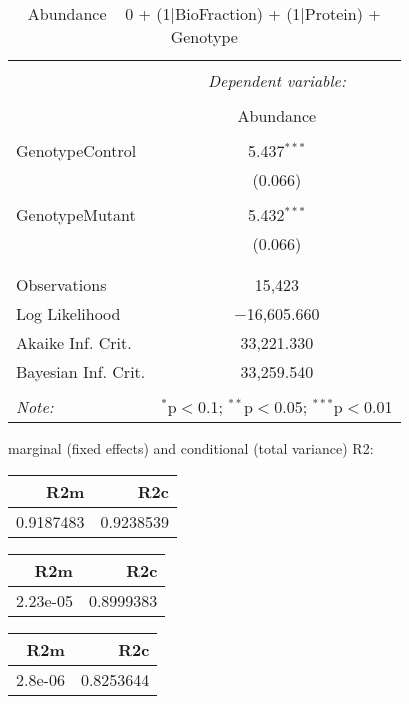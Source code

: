 \documentclass[11pt]{report}
\begin{document}
\begin{table}[!htbp] \centering 
  \caption{Abundance ~ 0 + (1|BioFraction) + (1|Protein) + Genotype} 
  \label{} 
\begin{tabular}{@{\extracolsep{5pt}}lc} 
\\[-1.8ex]\hline 
\hline \\[-1.8ex] 
 & \multicolumn{1}{c}{\textit{Dependent variable:}} \\ 
\cline{2-2} 
\\[-1.8ex] & Abundance \\ 
\hline \\[-1.8ex] 
 GenotypeControl & 5.437$^{***}$ \\ 
  & (0.066) \\ 
  & \\ 
 GenotypeMutant & 5.432$^{***}$ \\ 
  & (0.066) \\ 
  & \\ 
\hline \\[-1.8ex] 
Observations & 15,423 \\ 
Log Likelihood & $-$16,605.660 \\ 
Akaike Inf. Crit. & 33,221.330 \\ 
Bayesian Inf. Crit. & 33,259.540 \\ 
\hline 
\hline \\[-1.8ex] 
\textit{Note:}  & \multicolumn{1}{r}{$^{*}$p$<$0.1; $^{**}$p$<$0.05; $^{***}$p$<$0.01} \\ 
\end{tabular} 
\end{table} 
marginal (fixed effects) and conditional (total variance) R2:

\begin{tabular}{r|r}
\hline
R2m & R2c\\
\hline
0.9187483 & 0.9238539\\
\hline
\end{tabular}

\begin{tabular}{r|r}
\hline
R2m & R2c\\
\hline
2.23e-05 & 0.8999383\\
\hline
\end{tabular}

\begin{tabular}{r|r}
\hline
R2m & R2c\\
\hline
2.8e-06 & 0.8253644\\
\hline
\end{tabular}
\end{document}
